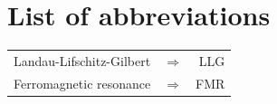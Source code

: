 \documentclass[12pt,a4paper]{article}
\begin{document}
\newpage

\section*{List of abbreviations}

\begin{table}[ht]
    \begin{tabular}{ l c r }
        Landau-Lifschitz-Gilbert & $\Longrightarrow$ & LLG \\
        Ferromagnetic resonance & $\Longrightarrow$ & FMR \\
    \end{tabular}
\end{table}



\end{document}
